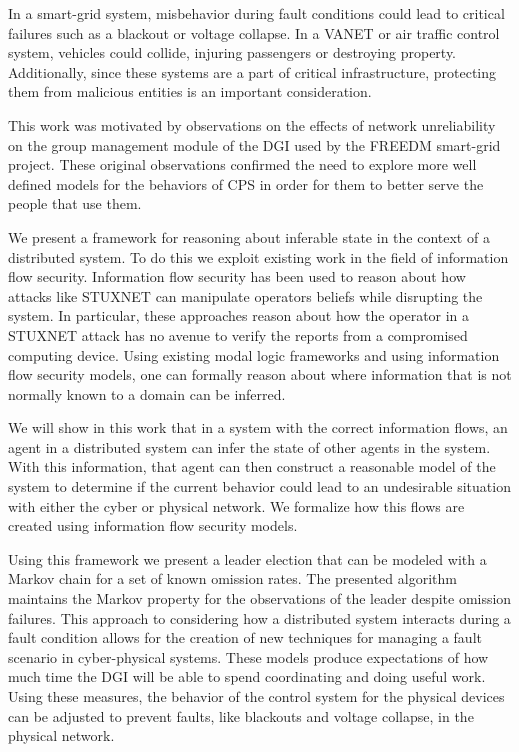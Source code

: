 In a smart-grid system, misbehavior during fault conditions could lead to critical failures such as a blackout or voltage collapse. In a \ac{VANET} or air traffic control system, vehicles could collide, injuring passengers or destroying property. Additionally, since these systems are a part of critical infrastructure, protecting them from malicious entities is an important consideration.

This work was motivated by observations on the effects of network unreliability on the group management module of the \ac{DGI} used by the \ac{FREEDM} smart-grid project.
These original observations confirmed the need to explore more well defined models for the behaviors of \ac{CPS} in order for them to better serve the people that use them.

We present a framework for reasoning about inferable state in the context of a distributed system. To do this we exploit existing work in the field of information flow security. Information flow security has been used to reason about how attacks like STUXNET can manipulate operators beliefs while disrupting the system\cite{STUXNET}. In particular, these approaches reason about how the operator in a STUXNET attack has no avenue to verify the reports from a compromised computing device. Using existing modal logic frameworks and using information flow security models\cite{Howser2012}\cite{STUXNET}\cite{Howser2013}, one can formally reason about where information that is not normally known to a domain can be inferred.

We will show in this work that in a system with the correct information flows, an agent in a distributed system can infer the state of other agents in the system. With this information, that agent can then construct a reasonable model of the system to determine if the current behavior could lead to an undesirable situation with either the cyber or physical network. We formalize how this flows are created using information flow security models.

Using this framework we present a leader election that can be modeled with a Markov chain for a set of known omission rates.
The presented algorithm maintains the Markov property for the observations of the leader despite omission\cite{OMISSIONFAILURES} failures.
This approach to considering how a distributed system interacts during a fault condition allows for the creation of new techniques for managing a fault scenario in cyber-physical systems.
These models produce expectations of how much time the DGI will be able to spend coordinating and doing useful work.
Using these measures, the behavior of the control system for the physical devices can be adjusted to prevent faults, like blackouts and voltage collapse, in the physical network.

